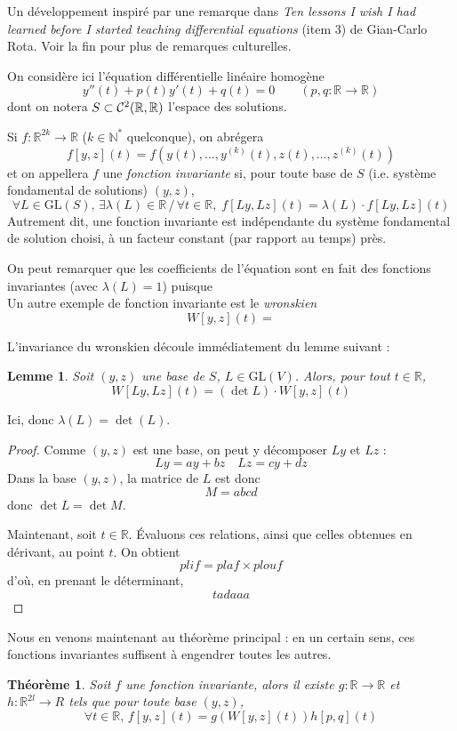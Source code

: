 \documentclass[a4paper, 11pt]{article}
\def\N{\mathbb{N}}
\def\R{\mathbb{R}}
\def\Cf{{\cal{C}}}
\def\GL{\mathrm{GL}}
\newtheorem*{theorem}{Théorème}
\newtheorem*{lemma}{Lemme}
\begin{document}
Un développement inspiré par une remarque dans \emph{Ten lessons I wish I had
  learned before I started teaching differential equations} (item 3) de
Gian-Carlo Rota. Voir la fin pour plus de remarques culturelles. 

On considère ici l'équation différentielle linéaire
homogène
\[ y''(t) + p(t)y'(t) + q(t) = 0 \qquad (p, q : \R \to \R) \]
dont on notera $S \subset \Cf^2(\R, \R)$ l'espace des solutions.

Si $f : \R^{2k} \to \R$ ($k \in \N^*$ quelconque), on abrégera
\[ f[y,z](t) = f \left(y(t), \ldots, y^{(k)}(t), z(t), \ldots,
    z^{(k)}(t)\right) \]
et on appellera $f$ une \emph{fonction invariante} si, pour toute
base de $S$ (i.e. système fondamental de solutions) $(y, z)$,
\[
  \forall L \in \GL(S),\, \exists \lambda(L) \in \R \,/\, \forall t \in \R,\;
  f[Ly,Lz](t) = \lambda(L) \cdot f[Ly, Lz](t)
\]
Autrement dit, une fonction invariante est indépendante du système fondamental
de solution choisi, à un facteur constant (par rapport au temps) près.

On peut remarquer que les coefficients de l'équation sont en fait des fonctions
invariantes (avec $\lambda(L) = 1$) puisque
\[ \]
Un autre exemple de fonction invariante est le \emph{wronskien}
\[  W[y,z](t) =  \]

L'invariance du wronskien découle immédiatement du lemme suivant :
\begin{lemma}
  Soit $(y, z)$ une base de $S$, $L \in \GL(V)$. Alors, pour tout $t \in \R$,
  \[ W[Ly,Lz](t) = (\det L) \cdot W[y,z](t) \]
\end{lemma}
Ici, donc $\lambda(L) = \det(L)$.
\begin{proof}
  Comme $(y,z)$ est une base, on peut y décomposer $Ly$ et $Lz$ :
  \[ Ly = ay + bz \quad Lz = cy + dz \]
  Dans la base $(y,z)$, la matrice de $L$ est donc
  \[ M = abcd \]
  donc $\det L = \det M$.

  Maintenant, soit $t \in \R$. Évaluons ces relations, ainsi que celles obtenues
  en dérivant, au point $t$. On obtient
  \[ plif = plaf \times plouf \]
  d'où, en prenant le déterminant,
  \[ tadaaa \]
\end{proof}

Nous en venons maintenant au théorème principal : en un certain sens, ces
fonctions invariantes suffisent à engendrer toutes les autres.

\begin{theorem}
  Soit $f$ une fonction invariante, alors il existe $g : \R \to \R$ et $h :
  \R^{2l} \to R$ tels que pour toute base $(y,z)$,
  \[ \forall t \in \R,\, f[y,z](t) = g(W[y,z](t))h[p,q](t) \]
\end{theorem}
\end{document}
